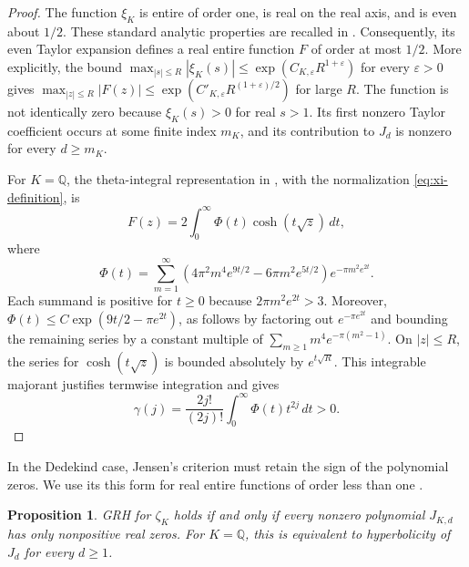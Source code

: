 \documentclass[11pt,reqno]{amsart}
\numberwithin{equation}{section}
\newtheorem{proposition}[theorem]{Proposition}
\newcommand{\dd}{\,d}
\begin{document}
\begin{proof}
The function $\xi_K$ is entire of order one, is real on the real
axis, and is even about $1/2$. These standard analytic properties
are recalled in \cite[Section~2.1]{HSW}. Consequently, its even
Taylor expansion defines a real entire function $F$ of order at
most $1/2$. More explicitly, the bound
$\max_{|s|\le R}|\xi_K(s)|\le\exp(C_{K,\varepsilon}R^{1+\varepsilon})$
for every $\varepsilon>0$ gives
$\max_{|z|\le R}|F(z)|\le
\exp(C'_{K,\varepsilon}R^{(1+\varepsilon)/2})$ for large $R$.
The function is not identically zero because $\xi_K(s)>0$ for
real $s>1$. Its first nonzero Taylor coefficient occurs at some
finite index $m_K$, and its contribution to $J_d$ is nonzero for
every $d\ge m_K$.

For $K=\mathbb Q$, the theta-integral representation in
\cite[(1.1)--(1.2)]{LM}, with the normalization
\eqref{eq:xi-definition}, is
\begin{equation}\label{eq:theta-integral}
 F(z)=2\int_0^\infty\Phi(t)\cosh(t\sqrt z)\dd t,
\end{equation}
where
\begin{equation}\label{eq:Phi}
 \Phi(t)=\sum_{m=1}^{\infty}
 \left(4\pi^2m^4e^{9t/2}-6\pi m^2e^{5t/2}\right)
 e^{-\pi m^2e^{2t}}.
\end{equation}
Each summand is positive for $t\ge0$ because
$2\pi m^2e^{2t}>3$. Moreover,
$\Phi(t)\le C\exp(9t/2-\pi e^{2t})$, as follows by factoring
out $e^{-\pi e^{2t}}$ and bounding the remaining series by a
constant multiple of $\sum_{m\ge1}m^4e^{-\pi(m^2-1)}$.
On $|z|\le R$, the series for $\cosh(t\sqrt z)$ is bounded
absolutely by $e^{t\sqrt R}$. This integrable majorant justifies
termwise integration and gives
\begin{equation}\label{eq:gamma-integral}
 \gamma(j)=\frac{2j!}{(2j)!}
             \int_0^\infty\Phi(t)t^{2j}\dd t>0.
\end{equation}
\end{proof}

In the Dedekind case, Jensen's criterion must retain the sign of
the polynomial zeros. We use its this form for real entire
functions of order less than one 
\cite[Theorem~3.1 and Corollary~3.2]{OS}.

\begin{proposition}\label{prop:Jensen-criterion}
GRH for $\zeta_K$ holds if and only if every nonzero polynomial
$J_{K,d}$ has only nonpositive real zeros. For $K=\mathbb Q$,
this is equivalent to hyperbolicity of $J_d$ for every $d\ge1$.
\end{proposition}
\end{document}
